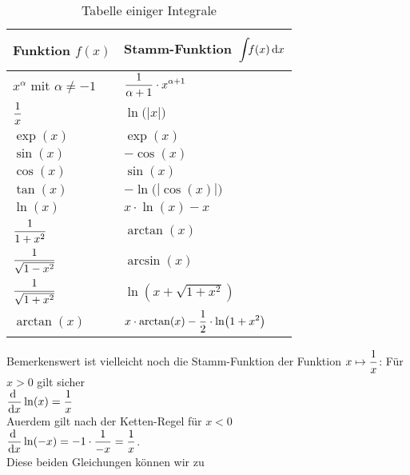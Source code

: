 \begin{table}[h]
  \centering
  \begin{tabular}[t]{|l|l|}
    \hline
    Funktion $f(x)$ & Stamm-Funktion $\ds \rule[-12pt]{0pt}{30pt}\int\!\! f(x) \, \dr x$ \\
    \hline
    \hline
    $x^\alpha$ mit $\alpha\not= -1$ & \rule[-12pt]{0pt}{30pt} $\displaystyle \frac{1}{\alpha + 1}\cdot x^{\alpha + 1}$ \\
    \hline
    $\displaystyle \frac{1}{x} $ & \rule[-12pt]{0pt}{30pt} $\ln\bigl(|x|\bigr)$ \\
    \hline
    $\exp(x)$                      & \rule[-6pt]{0pt}{18pt} $\exp(x)$ \\
    \hline
    $\sin(x)$                      & \rule[-6pt]{0pt}{18pt} $-\cos(x)$ \\
    \hline
    $\cos(x)$                      & \rule[-6pt]{0pt}{18pt} $\sin(x)$ \\
    \hline
    $\tan(x) $ & \rule[-6pt]{0pt}{18pt} $-\ln\bigl(|\cos(x)|\bigr)$ \\
    \hline
    $\ln(x)$ & \rule[-6pt]{0pt}{18pt} $x\cdot \ln(x) - x$ \\
    \hline
    $\displaystyle \frac{1}{1+x^2}$ & \rule[-12pt]{0pt}{30pt} $\arctan(x)$ \\
    \hline
    $\displaystyle \frac{1}{\sqrt{1-x^2}} $ & \rule[-14pt]{0pt}{30pt} $\arcsin(x)$ \\
    \hline
    $\displaystyle \frac{1}{\sqrt{1+x^2}} $ & \rule[-14pt]{0pt}{30pt} $ \ln  \left( x+\sqrt {1+{x}^{2}} \right) $ \\
    \hline
    $\arctan(x)$ & \rule[-12pt]{0pt}{30pt} $\displaystyle x\cdot \arctan(x) -\frac{1}{2}\cdot \ln\bigl( 1+{x}^{2} \bigr)$ \\
    \hline
  \end{tabular}
  \caption{Tabelle einiger Integrale}
  \label{tab:integrale}
\end{table}
Bemerkenswert ist vielleicht noch die Stamm-Funktion der Funktion $\displaystyle x \mapsto \frac{1}{x}$:
F\"ur $x>0$ gilt 
sicher 
\\[0.2cm]
\hspace*{1.3cm}
$\displaystyle\frac{\textrm{d}\;}{\textrm{d}x} \ln(x) = \frac{1}{x}$
\\[0.2cm]
Au\3erdem gilt nach der Ketten-Regel f\"ur $x < 0$ 
\\[0.2cm]
\hspace*{1.3cm}
$\displaystyle\frac{\textrm{d}\;}{\textrm{d}x} \ln(-x) = -1 \cdot  \frac{1}{-x} = \frac{1}{x}$.
\\[0.2cm]
Diese beiden Gleichungen k\"onnen wir zu 
\\[0.2cm]
\hspace*{1.3cm}
